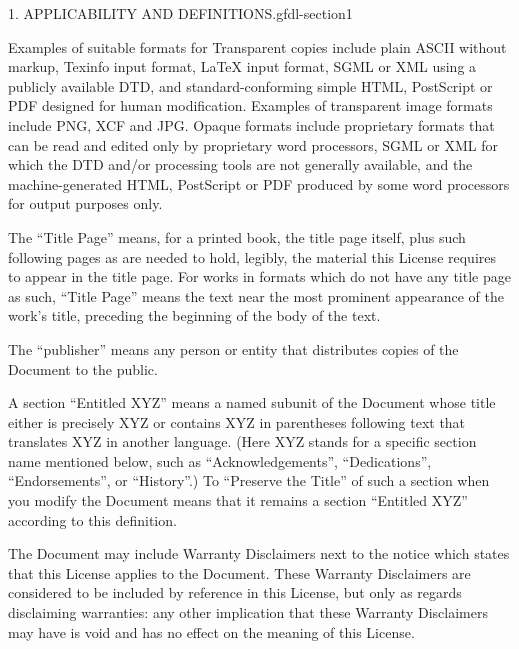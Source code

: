 \documentclass[10pt,]{book}
\numberwithin{equation}{section}
\begin{document}
\begin{paragraphs}{1. APPLICABILITY AND DEFINITIONS.}{gfdl-section1}
\par
\hypertarget{p-1535}{}%
Examples of suitable formats for Transparent copies include plain ASCII without markup, Texinfo input format, LaTeX input format, SGML or XML using a publicly available DTD, and standard-conforming simple HTML, PostScript or PDF designed for human modification. Examples of transparent image formats include PNG, XCF and JPG. Opaque formats include proprietary formats that can be read and edited only by proprietary word processors, SGML or XML for which the DTD and/or processing tools are not generally available, and the machine-generated HTML, PostScript or PDF produced by some word processors for output purposes only.%
\par
\hypertarget{p-1536}{}%
The ``Title Page'' means, for a printed book, the title page itself, plus such following pages as are needed to hold, legibly, the material this License requires to appear in the title page. For works in formats which do not have any title page as such, ``Title Page'' means the text near the most prominent appearance of the work's title, preceding the beginning of the body of the text.%
\par
\hypertarget{p-1537}{}%
The ``publisher'' means any person or entity that distributes copies of the Document to the public.%
\par
\hypertarget{p-1538}{}%
A section ``Entitled XYZ'' means a named subunit of the Document whose title either is precisely XYZ or contains XYZ in parentheses following text that translates XYZ in another language. (Here XYZ stands for a specific section name mentioned below, such as ``Acknowledgements'', ``Dedications'', ``Endorsements'', or ``History''.) To ``Preserve the Title'' of such a section when you modify the Document means that it remains a section ``Entitled XYZ'' according to this definition.%
\par
\hypertarget{p-1539}{}%
The Document may include Warranty Disclaimers next to the notice which states that this License applies to the Document. These Warranty Disclaimers are considered to be included by reference in this License, but only as regards disclaiming warranties: any other implication that these Warranty Disclaimers may have is void and has no effect on the meaning of this License.%
\end{paragraphs}%
\end{document}
